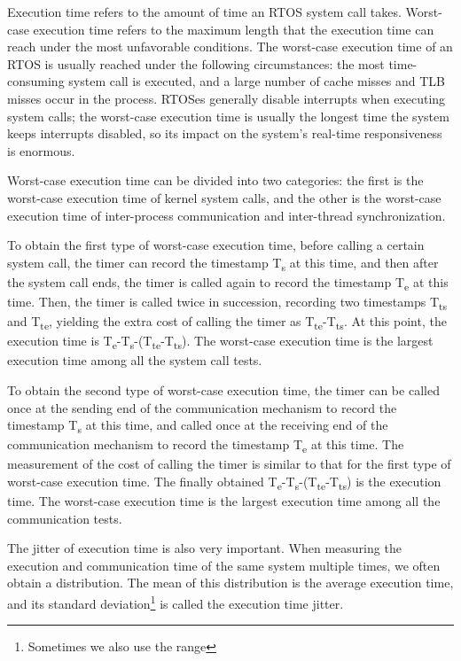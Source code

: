 Execution time refers to the amount of time an RTOS system call takes. Worst-case execution time refers to the maximum length that the execution time can reach under the most unfavorable conditions. The worst-case execution time of an RTOS is usually reached under the following circumstances: the most time-consuming system call is executed, and a large number of cache misses and TLB misses occur in the process. RTOSes generally disable interrupts when executing system calls; the worst-case execution time is usually the longest time the system keeps interrupts disabled, so its impact on the system's real-time responsiveness is enormous.

Worst-case execution time can be divided into two categories: the first is the worst-case execution time of kernel system calls, and the other is the worst-case execution time of inter-process communication and inter-thread synchronization.

To obtain the first type of worst-case execution time, before calling a certain system call, the timer can record the timestamp T\textsubscript{s} at this time, and then after the system call ends, the timer is called again to record the timestamp T\textsubscript{e} at this time. Then, the timer is called twice in succession, recording two timestamps T\textsubscript{ts} and T\textsubscript{te}, yielding the extra cost of calling the timer as T\textsubscript{te}-T\textsubscript{ts}. At this point, the execution time is T\textsubscript{e}-T\textsubscript{s}-(T\textsubscript{te}-T\textsubscript{ts}). The worst-case execution time is the largest execution time among all the system call tests.

To obtain the second type of worst-case execution time, the timer can be called once at the sending end of the communication mechanism to record the timestamp T\textsubscript{s} at this time, and called once at the receiving end of the communication mechanism to record the timestamp T\textsubscript{e} at this time. The measurement of the cost of calling the timer is similar to that for the first type of worst-case execution time. The finally obtained T\textsubscript{e}-T\textsubscript{s}-(T\textsubscript{te}-T\textsubscript{ts}) is the execution time. The worst-case execution time is the largest execution time among all the communication tests.

The jitter of execution time is also very important. When measuring the execution and communication time of the same system multiple times, we often obtain a distribution. The mean of this distribution is the average execution time, and its standard deviation\footnote{Sometimes we also use the range} is called the execution time jitter.

